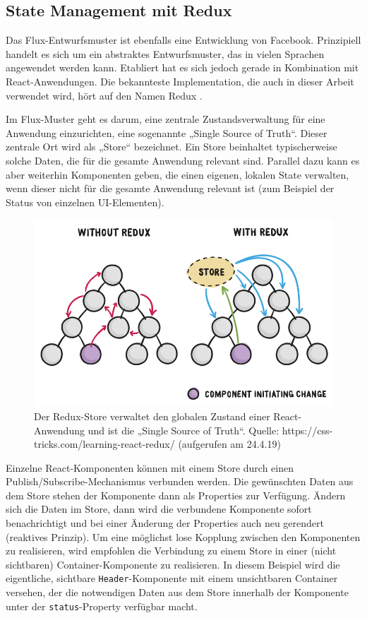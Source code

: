 \subsection{State Management mit Redux}
Das Flux-Entwurfsmuster ist ebenfalls eine Entwicklung von Facebook. Prinzipiell handelt es sich um ein abstraktes Entwurfsmuster, das in vielen Sprachen angewendet werden kann. Etabliert hat es sich jedoch gerade in Kombination mit React-Anwendungen. Die bekannteste Implementation, die auch in dieser Arbeit verwendet wird, hört auf den Namen Redux \cite{web:redux}.

Im Flux-Muster geht es darum, eine zentrale Zustandsverwaltung für eine Anwendung einzurichten, eine sogenannte „Single Source of Truth“. Dieser zentrale Ort wird als „Store“ bezeichnet. Ein Store beinhaltet typischerweise solche Daten, die für die gesamte Anwendung relevant sind. Parallel dazu kann es aber weiterhin Komponenten geben, die einen eigenen, lokalen State verwalten, wenn dieser nicht für die gesamte Anwendung relevant ist (zum Beispiel der Status von einzelnen UI-Elementen).

\begin{figure}[H]
    \includegraphics[width=12cm]{chapter/entwurf/BA_redux.png}
    \centering
    \caption{Der Redux-Store verwaltet den globalen Zustand einer React-Anwendung und ist die „Single Source of Truth“. Quelle: https://css-tricks.com/learning-react-redux/ (aufgerufen am 24.4.19)}
    \label{Abbildung 4.1.3}
\end{figure}


Einzelne React-Komponenten können mit einem Store durch einen Publish/Subscribe-Mechanismus verbunden werden. Die gewünschten Daten aus dem Store stehen der Komponente dann als Properties zur Verfügung. Ändern sich die Daten im Store, dann wird die verbundene Komponente sofort benachrichtigt und bei einer Änderung der Properties auch neu gerendert (reaktives Prinzip). Um eine möglichst lose Kopplung zwischen den Komponenten zu realisieren, wird empfohlen die Verbindung zu einem Store in einer (nicht sichtbaren) Container-Komponente zu realisieren. In diesem Beispiel wird die eigentliche, sichtbare \texttt{Header}-Komponente mit einem unsichtbaren Container versehen, der die notwendigen Daten aus dem Store innerhalb der Komponente unter der \texttt{status}-Property verfügbar macht.

